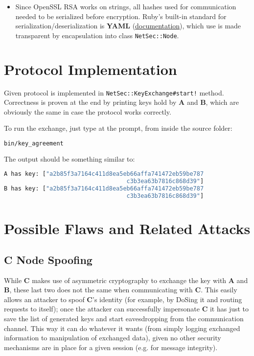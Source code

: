 \documentclass[a4paper,12pt,titlepage]{article}
\begin{document}
\begin{itemize}
	\item Since OpenSSL RSA works on strings, all hashes used for communication needed
  to be serialized before encryption. Ruby's built-in standard for
  serialization/deserialization is \textbf{YAML}
  (\href{http://www.ruby-doc.org/stdlib-2.0/libdoc/yaml/rdoc/YAML.html}{documentation}),
  which use is made transparent by encapsulation into class \texttt{NetSec::Node}.
\end{itemize}

\section{Protocol Implementation}
Given protocol is implemented in \texttt{NetSec::KeyExchange\#start!} method. \\
Correctness is proven at the end by printing keys hold by \textbf{A} and \textbf{B},
which are obviously the same in case the protocol works correctly.

To run the exchange, just type at the prompt, from inside the source folder:

\begin{lstlisting}[language=bash]
bin/key_agreement
\end{lstlisting}

The output should be something similar to:

\begin{lstlisting}[language=bash]
A has key: ["a2b85f3a7164c411d8ea5eb66affa741472eb59be787
                                   c3b3ea63b7816c868d39"]
B has key: ["a2b85f3a7164c411d8ea5eb66affa741472eb59be787
                                   c3b3ea63b7816c868d39"]
\end{lstlisting}

\section{Possible Flaws and Related Attacks}
\subsection*{C Node Spoofing}
While \textbf{C} makes use of asymmetric cryptography to exchange the key with
\textbf{A} and \textbf{B}, these last two does not the same when communicating with
\textbf{C}. This easily allows an attacker to spoof \textbf{C}'s identity (for example,
by DoSing it and routing requests to itself); once the attacker can
successfully impersonate \textbf{C} it has just to save the list of generated keys
and start eavesdropping from the communication channel. This way it can do
whatever it wants (from simply logging exchanged information to manipulation of
exchanged data), given no other security mechanisms are in place for a given
session (e.g. for message integrity).
\end{document}
